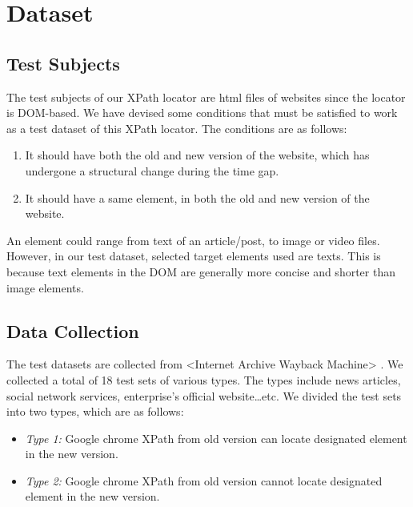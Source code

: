 \documentclass[format=acmlarge, nonacm=true]{acmart}
\begin{document}
\section{Dataset}
\subsection{Test Subjects}
The test subjects of our XPath locator are html files of websites since the locator is DOM-based. We have devised some conditions that must be satisfied to work as a test dataset of this XPath locator. The conditions are as follows:
\begin{enumerate}
	\item It should have both the old and new version of the website, which has undergone a structural change during the time gap.
	\item It should have a same element, in both the old and new version of the website. 
\end{enumerate}
An element could range from text of an article/post, to image or video files. However, in our test dataset, selected target elements used are texts. This is because text elements in the DOM are generally more concise and shorter than image elements.



\subsection{Data Collection}	
The test datasets are collected from <Internet Archive Wayback Machine> . We collected a total of 18 test sets of various types. The types include news articles, social network services, enterprise’s official website…etc. We divided the test sets into two types, which are as follows:
\begin{itemize}
	\item \emph{Type 1:} Google chrome XPath from old version can locate designated element in the new version.
	\item \emph{Type 2:} Google chrome XPath from old version cannot locate designated element in the new version.
\end{itemize}
\end{document}
